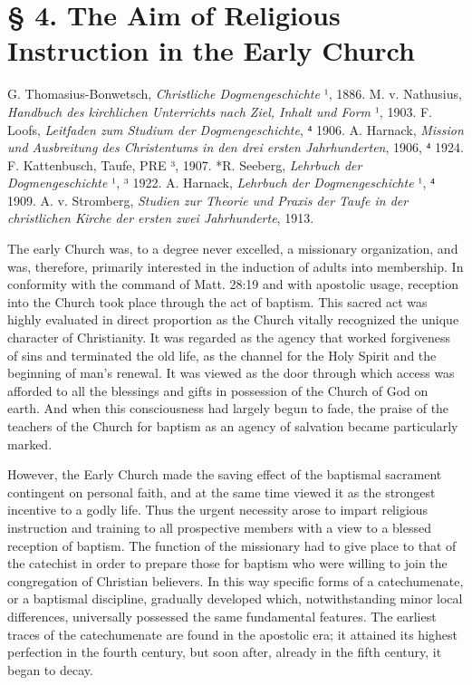 \section[§ 4. The Aim in the Early Church]{§ 4. The Aim of Religious Instruction in the Early Church}

G. Thomasius-Bonwetsch, \emph{Christliche Dogmengeschichte} ¹, 1886. M. v. Nathusius, \emph{Handbuch des kirchlichen Unterrichts nach Ziel, Inhalt und Form} ¹, 1903. F. Loofs, \emph{Leitfaden zum Studium der Dogmengeschichte}, ⁴ 1906. A. Harnack, \emph{Mission und Ausbreitung des Christentums in den drei ersten Jahrhunderten}, 1906, ⁴ 1924. F. Kattenbusch, Taufe, PRE ³, 1907. *R. Seeberg, \emph{Lehrbuch der Dogmengeschichte} ¹, ³ 1922. A. Harnack, \emph{Lehrbuch der Dogmengeschichte} ¹, ⁴ 1909. A. v. Stromberg, \emph{Studien zur Theorie und Praxis der Taufe in der christlichen Kirche der ersten zwei Jahrhunderte}, 1913.

The early Church was, to a degree never excelled, a missionary organization, and was, therefore, primarily interested in the induction of adults into membership. In conformity with the command of Matt. 28:19 and with apostolic usage, reception into the Church took place through the act of baptism. This sacred act was highly evaluated in direct proportion as the Church vitally recognized the unique character of Christianity. It was regarded as the agency that worked forgiveness of sins and terminated the old life, as the channel for the Holy Spirit and the beginning of man’s renewal. It was viewed as the door through which access was afforded to all the blessings and gifts in possession of the Church of God on earth. And when this consciousness had largely begun to fade, the praise of the teachers of the Church for baptism as an agency of salvation became particularly marked.

However, the Early Church made the saving effect of the baptismal sacrament contingent on personal faith, and at the same time viewed it as the strongest incentive to a godly life. Thus the urgent necessity arose to impart religious instruction and training to all prospective members
with a view to a blessed reception of baptism. The function of the missionary had to give place to that of the catechist in order to prepare those for baptism who were willing to join the congregation of Christian believers. In this way specific forms of a catechumenate, or a baptismal discipline, gradually developed which, notwithstanding minor local differences, universally possessed the same fundamental features. The earliest traces of the catechumenate are found in the apostolic era; it attained its highest perfection in the fourth century, but soon after, already in the fifth century, it began to decay.

